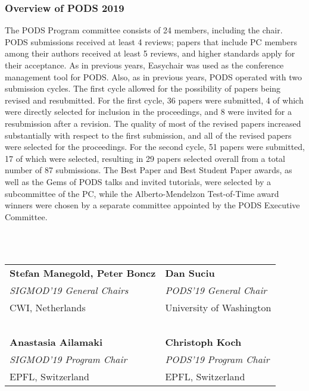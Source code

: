 \subsubsection*{Overview of PODS 2019}
The PODS Program committee consists of 24 members, including the chair. PODS submissions received at least 4 reviews; papers that include PC members among their authors received at least 5 reviews, and higher standards apply for their acceptance.  As in previous years, Easychair was used as the conference management tool for PODS. Also, as in previous years, PODS operated with two submission cycles. The first cycle allowed for the possibility of papers being revised and resubmitted. For the first cycle, 36 papers were submitted, 4 of which were directly selected for inclusion in the proceedings, and 8 were invited for a resubmission after a revision. The quality of most of the revised papers increased substantially with respect to the first submission, and all of the revised papers were selected for the proceedings. For the second cycle, 51 papers were submitted, 17 of which were selected, resulting in 29 papers selected overall from a total number of 87 submissions. The Best Paper and Best Student Paper awards, as well as the Gems of PODS talks and invited tutorials, were selected by a subcommittee of the PC, while the Alberto-Mendelzon Test-of-Time award winners were chosen by a separate committee appointed by the PODS Executive Committee.

~\\~

{%
\setlength{\tabcolsep}{0pt}
\begin{tabular*}{\textwidth}{@{\extracolsep{\fill}}ll}
\textbf{Stefan Manegold, Peter Boncz} & \textbf{Dan Suciu}           \\
\emph{SIGMOD'19 General Chairs}       & \emph{PODS'19 General Chair} \\
CWI, Netherlands                      & University of Washington     \\
 ~ & ~ \\
\textbf{Anastasia Ailamaki}           & \textbf{Christoph Koch}      \\
\emph{SIGMOD'19 Program Chair}        & \emph{PODS'19 Program Chair} \\
EPFL, Switzerland                     & EPFL, Switzerland            \\
\end{tabular*}
}
